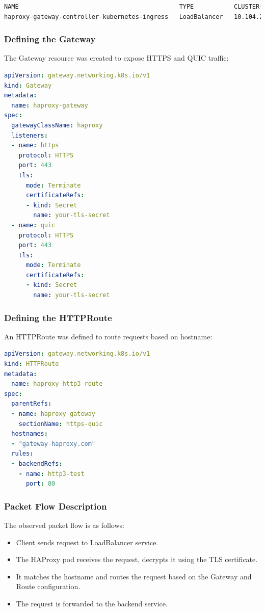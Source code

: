 \begin{lstlisting}[language=bash]
NAME                                            TYPE           CLUSTER-IP     EXTERNAL-IP    PORT(S)                                                                  AGE
haproxy-gateway-controller-kubernetes-ingress   LoadBalancer   10.104.20.31   192.168.49.5   80:31433/TCP,443:32261/TCP,443:32261/UDP,1024:30450/TCP,6060:31286/TCP   117s
\end{lstlisting}

\subsubsection{Defining the Gateway}

The Gateway resource was created to expose HTTPS and QUIC traffic:

\begin{lstlisting}[language=yaml]
apiVersion: gateway.networking.k8s.io/v1
kind: Gateway
metadata:
  name: haproxy-gateway
spec:
  gatewayClassName: haproxy
  listeners:
  - name: https
    protocol: HTTPS
    port: 443
    tls:
      mode: Terminate
      certificateRefs:
      - kind: Secret
        name: your-tls-secret
  - name: quic
    protocol: HTTPS
    port: 443
    tls:
      mode: Terminate
      certificateRefs:
      - kind: Secret
        name: your-tls-secret
\end{lstlisting}

\subsubsection{Defining the HTTPRoute}

An HTTPRoute was defined to route requests based on hostname:

\begin{lstlisting}[language=yaml]
apiVersion: gateway.networking.k8s.io/v1
kind: HTTPRoute
metadata:
  name: haproxy-http3-route
spec:
  parentRefs:
  - name: haproxy-gateway
    sectionName: https-quic
  hostnames:
  - "gateway-haproxy.com"
  rules:
  - backendRefs:
    - name: http3-test
      port: 80
\end{lstlisting}

\subsubsection{Packet Flow Description}

The observed packet flow is as follows:

\begin{itemize}
  \item Client sends request to LoadBalancer service.
  \item The HAProxy pod receives the request, decrypts it using the TLS certificate.
  \item It matches the hostname and routes the request based on the Gateway and Route configuration.
  \item The request is forwarded to the backend service.
\end{itemize}

